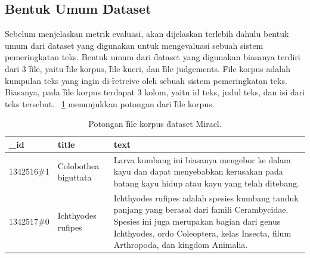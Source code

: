     \subsection{Bentuk Umum \f{Dataset}}
    \label{sec:dataset-umum}
    Sebelum menjelaskan metrik evaluasi, akan dijelaskan terlebih dahulu bentuk umum dari \f{dataset} yang digunakan untuk mengevaluasi sebuah sistem pemeringkatan teks. Bentuk umum dari \f{dataset} yang digunakan biasanya terdiri dari 3 \f{file}, yaitu \f{file} korpus, \f{file} kueri, dan \f{file judgements}. \f{File} korpus adalah kumpulan teks yang ingin di-\f{retreive} oleh sebuah sistem pemeringkatan teks. Biasanya, pada \f{file} korpus terdapat 3 kolom, yaitu id teks, judul teks, dan isi dari teks tersebut. \tab~\ref{tab:contoh-file-korpus} menunjukkan potongan dari \f{file} korpus.
    \begin{table}
        \centering
        \caption{Potongan \f{file} korpus \f{dataset} Miracl.}
        \label{tab:contoh-file-korpus}
        \begin{tabular}{|l|l|p{}|}
            \hline
            \textbf{\_id}    & \textbf{title}             & \textbf{text}                                                                                                 \\ \hline
            1342516\#1  & Colobothea biguttata & Larva kumbang ini biasanya mengebor ke dalam kayu dan dapat menyebabkan kerusakan pada batang kayu hidup atau kayu yang telah ditebang. \\ \hline
            1342517\#0  & Ichthyodes rufipes  & Ichthyodes rufipes adalah spesies kumbang tanduk panjang yang berasal dari famili Cerambycidae. Spesies ini juga merupakan bagian dari genus Ichthyodes, ordo Coleoptera, kelas Insecta, filum Arthropoda, dan kingdom Animalia. \\ \hline
        \end{tabular}
    \end{table}

